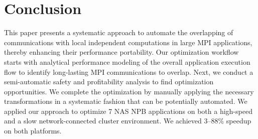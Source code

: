 \section{Conclusion}
\label{sec-concl}

This paper presents a systematic approach to automate the overlapping
of communications with local independent computations in large MPI
applications, thereby enhancing their performance portability.  Our
optimization workflow starts with analytical performance modeling of
the overall application execution flow to identify long-lasting MPI
communications to overlap. Next, we conduct a semi-automatic safety
and profitability analysis to find optimization opportunities. We
complete the optimization by manually applying the necessary
transformations in a systematic fashion that can be potentially
automated.  We applied our approach to optimize 7 NAS NPB applications
on both a high-speed and a slow network-connected cluster
environment. We achieved 3--88\% speedup on both platforms.
